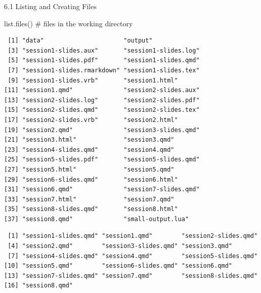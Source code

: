 \documentclass[
  ignorenonframetext,
  aspectratio=169,
]{beamer}
\newenvironment{Shaded}{\begin{snugshade}}{\end{snugshade}}
\newcommand{\AttributeTok}[1]{\textcolor[rgb]{0.40,0.45,0.13}{#1}}
\newcommand{\CommentTok}[1]{\textcolor[rgb]{0.37,0.37,0.37}{#1}}
\newcommand{\FunctionTok}[1]{\textcolor[rgb]{0.28,0.35,0.67}{#1}}
\newcommand{\NormalTok}[1]{\textcolor[rgb]{0.00,0.23,0.31}{#1}}
\newcommand{\SpecialCharTok}[1]{\textcolor[rgb]{0.37,0.37,0.37}{#1}}
\newcommand{\StringTok}[1]{\textcolor[rgb]{0.13,0.47,0.30}{#1}}
\begin{document}
\begin{frame}[fragile]{6.1 Listing and Creating Files}
\protect{}\label{listing-and-creating-files}
\begin{Shaded}
\begin{Highlighting}[]
\FunctionTok{list.files}\NormalTok{()                         }\CommentTok{\# files in the working directory}
\end{Highlighting}
\end{Shaded}

\begingroup\tiny\color{darkgray}

\begin{verbatim}
 [1] "data"                      "output"                   
 [3] "session1-slides.aux"       "session1-slides.log"      
 [5] "session1-slides.pdf"       "session1-slides.qmd"      
 [7] "session1-slides.rmarkdown" "session1-slides.tex"      
 [9] "session1-slides.vrb"       "session1.html"            
[11] "session1.qmd"              "session2-slides.aux"      
[13] "session2-slides.log"       "session2-slides.pdf"      
[15] "session2-slides.qmd"       "session2-slides.tex"      
[17] "session2-slides.vrb"       "session2.html"            
[19] "session2.qmd"              "session3-slides.qmd"      
[21] "session3.html"             "session3.qmd"             
[23] "session4-slides.qmd"       "session4.qmd"             
[25] "session5-slides.pdf"       "session5-slides.qmd"      
[27] "session5.html"             "session5.qmd"             
[29] "session6-slides.qmd"       "session6.html"            
[31] "session6.qmd"              "session7-slides.qmd"      
[33] "session7.html"             "session7.qmd"             
[35] "session8-slides.qmd"       "session8.html"            
[37] "session8.qmd"              "small-output.lua"         
\end{verbatim}

\endgroup

\begin{Shaded}
\end{Shaded}

\begingroup\tiny\color{darkgray}

\begin{verbatim}
 [1] "session1-slides.qmd" "session1.qmd"        "session2-slides.qmd"
 [4] "session2.qmd"        "session3-slides.qmd" "session3.qmd"       
 [7] "session4-slides.qmd" "session4.qmd"        "session5-slides.qmd"
[10] "session5.qmd"        "session6-slides.qmd" "session6.qmd"       
[13] "session7-slides.qmd" "session7.qmd"        "session8-slides.qmd"
[16] "session8.qmd"       
\end{verbatim}


\end{frame}
\end{document}
